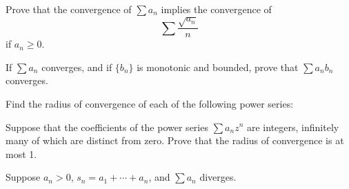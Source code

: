 \begin{questions}

  \question Prove that the convergence of $\sum a_n$ implies the convergence of
  \[ \sum \frac{\sqrt{a_n}}{n} \]
  if $a_n\geq0$.

  \question If $\sum a_n$ converges, and if $\{b_n\}$ is monotonic and bounded, prove that $\sum a_nb_n$ converges.

  \question Find the radius of convergence of each of the following power series:

  \question Suppose that the coefficients of the power series $\sum a_nz^n$ are integers, infinitely many of which are distinct from zero. Prove that the radius of convergence is at most 1.

  \question Suppose $a_n>0$, $s_n=a_1+\cdots+a_n$, and $\sum a_n$ diverges.
\end{questions}
